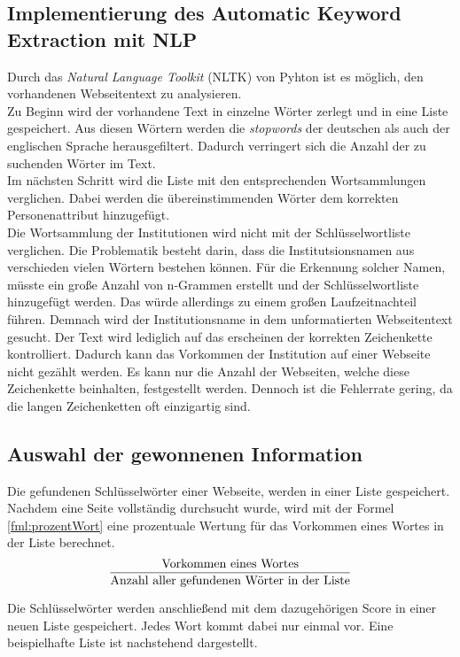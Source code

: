 	\subsection{Implementierung des Automatic Keyword Extraction mit NLP}
		\label{subsec:AutomaticKeywordExtractionNLP}
		Durch das \textit{Natural Language Toolkit} (NLTK) von Pyhton ist es möglich, den vorhandenen Webseitentext zu analysieren.\\
		Zu Beginn wird der vorhandene Text in einzelne Wörter zerlegt und in eine Liste gespeichert. Aus diesen Wörtern werden die \textit{stopwords} der deutschen als auch der englischen Sprache herausgefiltert. Dadurch verringert sich die Anzahl der zu suchenden Wörter im Text. \\
		Im nächsten Schritt wird die Liste mit den entsprechenden Wortsammlungen verglichen. Dabei werden die übereinstimmenden Wörter dem korrekten Personenattribut hinzugefügt.\\
		Die Wortsammlung der Institutionen wird nicht mit der Schlüsselwortliste verglichen. Die Problematik besteht darin, dass die Institutsionsnamen aus verschieden vielen Wörtern bestehen können. Für die Erkennung solcher Namen, müsste ein große Anzahl von n-Grammen erstellt und der Schlüsselwortliste hinzugefügt werden. Das würde allerdings zu einem großen Laufzeitnachteil führen. Demnach wird der Institutionsname in dem unformatierten Webseitentext gesucht. Der Text wird lediglich auf das erscheinen der korrekten Zeichenkette kontrolliert. Dadurch kann das Vorkommen der Institution auf einer Webseite nicht gezählt werden. Es kann nur die Anzahl der Webseiten, welche diese Zeichenkette beinhalten, festgestellt werden. Dennoch ist die Fehlerrate gering, da die langen Zeichenketten oft einzigartig sind.
		
	\subsection{Auswahl der gewonnenen Information}
		\label{subsec:AuswahlInformation}
		Die gefundenen Schlüsselwörter einer Webseite, werden in einer Liste gespeichert. Nachdem eine Seite vollständig durchsucht wurde, wird mit der Formel \ref{fml:prozentWort} eine prozentuale Wertung für das Vorkommen eines Wortes in der Liste berechnet.
		\begin{align}%
		\label{fml:prozentWort}
		\begin{split}%
		&\frac{\text{Vorkommen eines Wortes}}{\text{Anzahl aller gefundenen Wörter in der Liste}}\\[0.25\baselineskip]%
		\end{split}
		\end{align}
		Die Schlüsselwörter werden anschließend mit dem dazugehörigen Score in einer neuen Liste gespeichert. Jedes Wort kommt dabei nur einmal vor. Eine beispielhafte Liste ist nachstehend dargestellt.
		
